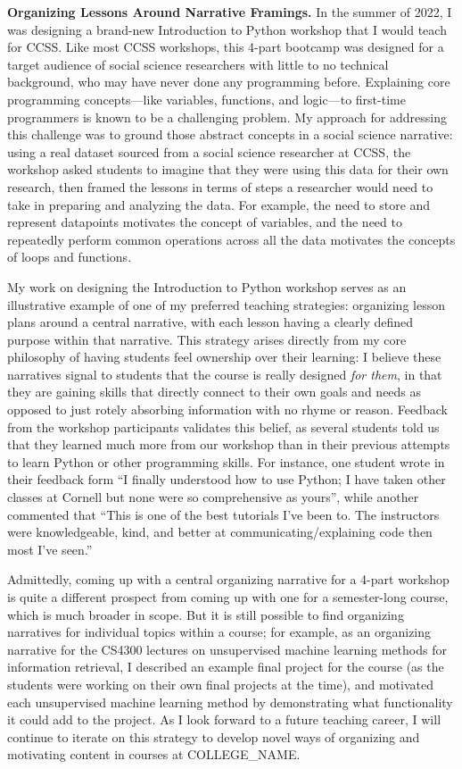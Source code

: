 \documentclass[11pt,letterpaper]{article}
\renewcommand{\section}[1]{\vspace{0.25\baselineskip}\noindent\textbf{#1.}}
\newcommand{\schoolname}{COLLEGE\_NAME}
\begin{document}
\section{Organizing Lessons Around Narrative Framings}
In the summer of 2022, I was designing a brand-new Introduction to Python workshop that I would teach for CCSS.
Like most CCSS workshops, this 4-part bootcamp was designed for a target audience of social science researchers with little to no technical background, who may have never done any programming before.
Explaining core programming concepts---like variables, functions, and logic---to first-time programmers is known to be a challenging problem.
My approach for addressing this challenge was to ground those abstract concepts in a social science narrative: using a real dataset sourced from a social science researcher at CCSS, the workshop asked students to imagine that they were using this data for their own research, then framed the lessons in terms of steps a researcher would need to take in preparing and analyzing the data.
For example, the need to store and represent datapoints motivates the concept of variables, and the need to repeatedly perform common operations across all the data motivates the concepts of loops and functions.

My work on designing the Introduction to Python workshop serves as an illustrative example of one of my preferred teaching strategies: organizing lesson plans around a central narrative, with each lesson having a clearly defined purpose within that narrative.
This strategy arises directly from my core philosophy of having students feel ownership over their learning: I believe these narratives signal to students that the course is really designed \emph{for them}, in that they are gaining skills that directly connect to their own goals and needs as opposed to just rotely absorbing information with no rhyme or reason.
Feedback from the workshop participants validates this belief, as several students told us that they learned much more from our workshop than in their previous attempts to learn Python or other programming skills.
For instance, one student wrote in their feedback form ``I finally understood how to use Python; I have taken other classes at Cornell but none were so comprehensive as yours'', while another commented that ``This is one of the best tutorials I've been to. The instructors were knowledgeable, kind, and better at communicating/explaining code then most I've seen.''

Admittedly, coming up with a central organizing narrative for a 4-part workshop is quite a different prospect from coming up with one for a semester-long course, which is much broader in scope.
But it is still possible to find organizing narratives for individual topics within a course; for example, as an organizing narrative for the CS4300 lectures on unsupervised machine learning methods for information retrieval, I described an example final project for the course (as the students were working on their own final projects at the time), and motivated each unsupervised machine learning method by demonstrating what functionality it could add to the project.  
As I look forward to a future teaching career, I will continue to iterate on this strategy to develop novel ways of organizing and motivating content in courses at \schoolname.
\end{document}
